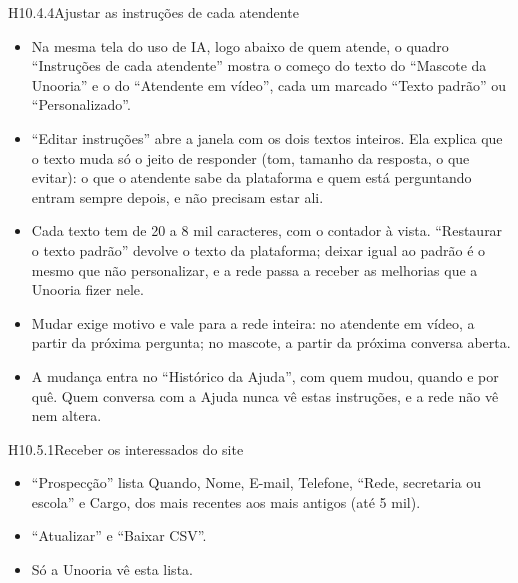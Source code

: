 \begin{historia}{H10.4.4}{Ajustar as instruções de cada atendente}{\pronto}
\aceite
\begin{itemize}
  \item Na mesma tela do uso de IA, logo abaixo de quem atende, o quadro
    \enquote{Instruções de cada atendente} mostra o começo do texto do
    \enquote{Mascote da Unooria} e o do \enquote{Atendente em vídeo}, cada um
    marcado \enquote{Texto padrão} ou \enquote{Personalizado}.
  \item \enquote{Editar instruções} abre a janela com os dois textos inteiros.
    Ela explica que o texto muda só o jeito de responder (tom, tamanho da
    resposta, o que evitar): o que o atendente sabe da plataforma e quem está
    perguntando entram sempre depois, e não precisam estar ali.
  \item Cada texto tem de 20 a 8 mil caracteres, com o contador à vista.
    \enquote{Restaurar o texto padrão} devolve o texto da plataforma; deixar
    igual ao padrão é o mesmo que não personalizar, e a rede passa a receber as
    melhorias que a Unooria fizer nele.
  \item Mudar exige motivo e vale para a rede inteira: no atendente em vídeo, a
    partir da próxima pergunta; no mascote, a partir da próxima conversa aberta.
  \item A mudança entra no \enquote{Histórico da Ajuda}, com quem mudou,
    quando e por quê. Quem conversa com a Ajuda nunca vê estas instruções, e a
    rede não vê nem altera.
\end{itemize}
\end{historia}


\begin{historia}{H10.5.1}{Receber os interessados do site}{\pronto}
\aceite
\begin{itemize}
  \item \enquote{Prospecção} lista Quando, Nome, E-mail, Telefone,
    \enquote{Rede, secretaria ou escola} e Cargo, dos mais recentes aos mais
    antigos (até 5 mil).
  \item \enquote{Atualizar} e \enquote{Baixar CSV}.
  \item Só a Unooria vê esta lista.
\end{itemize}
\end{historia}


